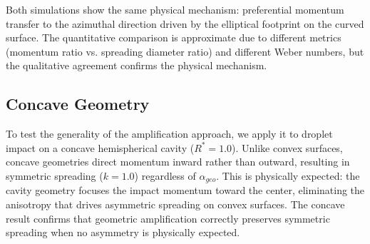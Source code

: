 Both simulations show the same physical mechanism: preferential momentum transfer to the azimuthal direction driven by the elliptical footprint on the curved surface. The quantitative comparison is approximate due to different metrics (momentum ratio vs. spreading diameter ratio) and different Weber numbers, but the qualitative agreement confirms the physical mechanism.

\subsection{Concave Geometry}

To test the generality of the amplification approach, we apply it to droplet impact on a concave hemispherical cavity ($R^*=1.0$). Unlike convex surfaces, concave geometries direct momentum inward rather than outward, resulting in symmetric spreading ($k = 1.0$) regardless of $\alpha_{geo}$. This is physically expected: the cavity geometry focuses the impact momentum toward the center, eliminating the anisotropy that drives asymmetric spreading on convex surfaces. The concave result confirms that geometric amplification correctly preserves symmetric spreading when no asymmetry is physically expected.
